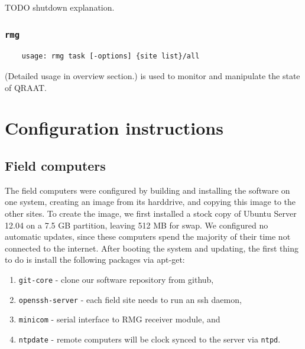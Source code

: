 \documentclass[letter]{article}
\begin{document}
TODO shutdown explanation. 

\subsubsection{\texttt{rmg}}
\begin{verbatim}
    usage: rmg task [-options] {site list}/all 
\end{verbatim}
(Detailed usage in overview section.)  is used to monitor and manipulate the 
state of QRAAT. 





\section{Configuration instructions}

\subsection{Field computers}
The field computers were configured by building and installing the software on one 
system, creating an image from its harddrive, and copying this image to the other sites. To create
the image, we first installed a stock copy of Ubuntu Server 12.04 on a 7.5 GB partition, leaving
512 MB for swap. We configured no automatic updates, since these computers spend the majority of 
their time not connected to the internet. After booting the system and updating, the first thing
to do is install the following packages via apt-get: 
\begin{enumerate}
  \item \texttt{git-core} - clone our software repository from github,
  \item \texttt{openssh-server} - each field site needs to run an ssh daemon,
  \item \texttt{minicom} - serial interface to RMG receiver module, and
  \item \texttt{ntpdate} - remote computers will be clock synced to the server via \texttt{ntpd}. 
\end{enumerate}
\end{document}
